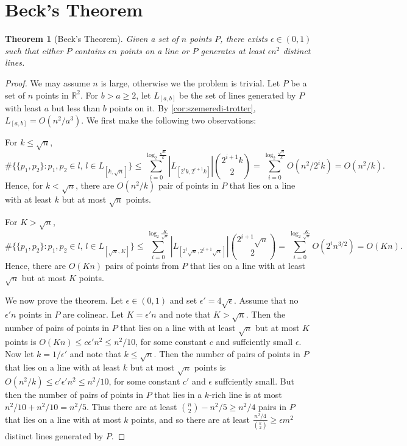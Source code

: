 \documentclass[12pt,reqno]{amsart}
\newtheorem{theorem}{Theorem}[section]
\theoremstyle{definition}
\theoremstyle{remark}
\renewcommand{\leq}{\leqslant}
\renewcommand{\geq}{\geqslant}
\def\R{\mathbb{R}}
\numberwithin{equation}{section}
\begin{document}
\newpage

\section{Beck's Theorem}

\begin{theorem}[Beck's Theorem]
	Given a set of $n$ points $P$, there exists $\epsilon \in (0, 1)$ such that either $P$ contains $\epsilon n$ points on a line or $P$ generates at least $\epsilon n^2$ distinct lines.
\end{theorem}

\begin{proof}
	We may assume $n$ is large, otherwise we the problem is trivial. Let $P$ be a set of $n$ points in $\R^2$. For $b > a \geq 2$, let $L_{[a, b]}$ be the set of lines generated by $P$ with least $a$ but less than $b$ points on it. By \cref{cor:szemeredi-trotter}, $L_{[a, b]} = O(n^2/a^3)$. We first make the following two observations:
	
	For $k \leq \sqrt{n}$,
	\[
		\#\{\{p_1, p_2\} : p_1, p_2 \in l, \, l \in L_{[k, \sqrt{n}]}\} \leq \sum_{i = 0}^{\log_2 \frac{\sqrt{n}}{k}} |L_{[2^ik, 2^{i + 1}k]}|\binom{2^{i + 1}k}{2} = \sum_{i = 0}^{\log_2 \frac{\sqrt{n}}{k}} O(n^2/2^{i}k) = O(n^2/k).
	\]
	Hence, for $k < \sqrt{n}$, there are $O(n^2/k)$ pair of points in $P$ that lies on a line with at least $k$ but at most $\sqrt{n}$ points. 
	
	For $K > \sqrt{n}$, 
	\[
		\#\{\{p_1, p_2\} : p_1, p_2 \in l, \, l \in L_{[\sqrt{n}, K]}\} \leq \sum_{i = 0}^{\log_2 \frac{K}{\sqrt{n}}} |L_{[2^i\sqrt{n}, 2^{i + 1}\sqrt{n}]}|\binom{2^{i + 1}\sqrt{n}}{2} = \sum_{i = 0}^{\log_2 \frac{K}{\sqrt{n}}} O(2^in^{3/2}) = O(Kn).
	\]
	Hence, there are $O(Kn)$ pairs of points from $P$ that lies on a line with at least $\sqrt{n}$ but at most $K$ points.

	We now prove the theorem. Let $\epsilon \in (0, 1)$ and set $\epsilon' = 4\sqrt{\epsilon}$. Assume that no $\epsilon' n$ points in $P$ are colinear. Let $K = \epsilon'n$ and note that $K > \sqrt{n}$. Then the number of pairs of points in $P$ that lies on a line with at least $\sqrt{n}$ but at most $K$ points is $O(Kn) \leq c\epsilon' n^2 \leq n^2/10$, for some constant $c$ and suffciently small $\epsilon$. Now let $k = 1/\epsilon'$ and note that $k \leq \sqrt{n}$. Then the number of pairs of points in $P$ that lies on a line with at least $k$ but at most $\sqrt{n}$ points is $O(n^2/k) \leq c'\epsilon' n^2 \leq n^2/10$, for some constant $c'$ and $\epsilon$ suffciently small. But then the number of pairs of points in $P$ that lies in a $k$-rich line is at most $n^2/10 + n^2/10 = n^2/5$. Thus there are at least $\binom{n}{2} - n^2/5 \geq n^2/4$ pairs in $P$ that lies on a line with at most $k$ points, and so there are at least $\frac{n^2/4}{\binom{k}{2}} \geq \epsilon m^2$ distinct lines generated by $P$.
\end{proof}
\end{document}
